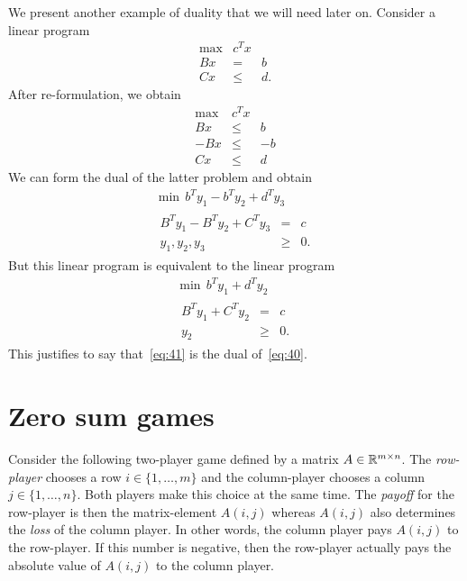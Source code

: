 We present another example of duality that we will need later on. 
Consider a linear program 
\begin{equation}
  \label{eq:40}
  \begin{array}{rcl}
    \max &c^Tx \\
    Bx &  =&  b\\
    Cx & \leq & d. 
  \end{array}
\end{equation}
After
re-formulation, we obtain 
\begin{displaymath}
  \begin{array}{rcl}
    \max & c^Tx & \\ Bx & \leq &  b \\ -Bx & \leq & -b \\ Cx & \leq &  d
  \end{array}
\end{displaymath}
We can form the dual of the latter problem
and obtain 
\begin{displaymath}
  \begin{array}{l}
    \min\, b^Ty_1 - b^Ty_2 + d^T y_3 \\
  \begin{array}{rcl}
   B^Ty_1 - B^T y_2 + C^T  y_3 & = &  c \\
  y_1,y_2,y_3& \geq & 0.
\end{array}
\end{array}
\end{displaymath}
But this linear program is
equivalent to the linear program 
\begin{equation}
  \label{eq:41}
  \begin{array}{c}
    \min \, b^Ty_1 + d^T y_2 \\
    \begin{array}{rcl}
      B^Ty_1 + C^T  y_2 & = &  c \\  y_2& \geq & 0. 
    \end{array}
  \end{array}
\end{equation}
%
This justifies to say that~\eqref{eq:41} is the dual of~\eqref{eq:40}.


\section{Zero sum games} 
\label{sec:zero-sum-games}

Consider the following two-player game defined by a matrix $A \in
\mathbb{R}^{m\times n}$. The \emph{row-player} chooses a row $i \in \{1,\ldots,m\}$ and the
column-player chooses a column $j \in \{1,\ldots,n\}$. Both players make
this choice at the same time.  The \emph{payoff} for the
row-player is then the matrix-element $A(i,j)$ whereas $A(i,j)$ also
determines the \emph{loss} of the column player. In other words, the
column player pays $A(i,j)$ to the row-player. If this number is
negative, then the row-player actually pays the absolute value of
$A(i,j)$ to the column player. 

